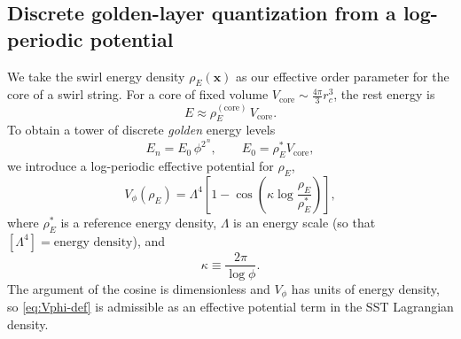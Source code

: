 \documentclass[10pt,reprint,aps,onecolumn,nofootinbib]{revtex4-2}
\newcommand{\rhoE}{\rho_{\!E}}                           %
\newcommand{\rc}{r_c}                                    %
\newcommand{\Golden}{\phi}
\newcommand{\GoldenSq}{\phi^{2}}
\begin{document}

    \subsection{Discrete golden-layer quantization from a log-periodic potential}

        We take the swirl energy density $\rhoE(\boldsymbol{x})$ as our effective
        order parameter for the core of a swirl string. For a core of fixed volume
        $V_{\text{core}} \sim \tfrac{4\pi}{3}\rc^{3}$, the rest energy is
        \begin{equation}
            E \approx \rhoE^{(\text{core})}\,V_{\text{core}}.
        \end{equation}
        To obtain a tower of discrete \emph{golden} energy levels
        \begin{equation}
            E_n = E_0\,\GoldenSq^{\,n},
            \qquad
            E_0 = \rhoE^{*} V_{\text{core}},
        \end{equation}
        we introduce a log-periodic effective potential for $\rhoE$,
        \begin{equation}
            V_{\Golden}(\rhoE)
            =
            \Lambda^4
            \left[
                1 - \cos\!\left(
                              \kappa \log\frac{\rhoE}{\rhoE^{*}}
            \right)
            \right],
            \label{eq:Vphi-def}
        \end{equation}
    where $\rhoE^{*}$ is a reference energy density, $\Lambda$ is an energy
    scale (so that $[\Lambda^4]=\text{energy density}$), and
    \begin{equation}
        \kappa \equiv \frac{2\pi}{\log\Golden} .
    \end{equation}
    The argument of the cosine is dimensionless and $V_{\Golden}$ has units of
    energy density, so \eqref{eq:Vphi-def} is admissible as an effective
    potential term in the SST Lagrangian density.
\end{document}
